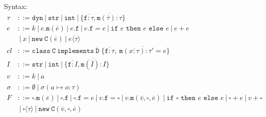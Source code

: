 \documentclass{report}
\begin{document}
\newcommand{\class}{\ensuremath{\xt{class}}\xspace}
\newcommand{\G}{\Gamma}
\renewcommand{\int}{\texttt{int}}
\newcommand{\coerce}{\Rightarrow} %
\newcommand{\str}{\texttt{str}}
\newcommand{\any}{\texttt{dyn}}   %
\newcommand{\dyn}{\texttt{dyn}}   %
\newcommand{\this}{\texttt{this}}
\newcommand{\ifthenelse}[3]{\texttt{if }#1\texttt{ then }#2\texttt{ else }#3}
\newcommand{\cast}[1]{\langle #1\rangle} 
\newcommand{\xt}[1]{\texttt{#1}}
\newcommand{\creduce}{\longrightarrow_{cr}}  %
\newcommand{\ereduce}{\longrightarrow_{e}}   %
\newcommand{\stepsto}{\longrightarrow}        %
\newcommand{\intv}[1]{\xt{int}[#1]}
\newcommand{\strv}[1]{\xt{str}[#1]}
\newcommand{\tlate}{\rightsquigarrow}
\newcommand{\s}{\sigma}
\renewcommand{\sc}{\mu}
\renewcommand{\t}{\tau}
\newcommand{\B}{\ensuremath{~|~}\xspace}
\newcommand{\new}{\ensuremath{\texttt{new}}\xspace}
\newcommand{\NEW}[2]{\ensuremath{  \new ~ #1 ( #2 )}\xspace}
\renewcommand{\bar}[1]{\ensuremath{\overline{ #1} }\xspace}
\newcommand{\m}{\ensuremath{\xt{m}}\xspace}
\newcommand{\f}{\ensuremath{\xt{f}}\xspace}
\newcommand{\C}{\ensuremath{\xt{C}}\xspace}
\newcommand{\D}{\ensuremath{\xt{D}}\xspace}
\newcommand{\is}{\mapsto}
\newcommand{\cl}{\mathit{cl}\xspace}
\newcommand{\implements}{\xt{implements}\xspace}
\newcommand{\CLASS}[3]{ \ensuremath{  \xt{class}~#1~\implements~#2\;\{ #3 \}}\xspace} 
\newcommand{\MDEF}[4] { #1( #2 ):#3 = #4}
\newcommand{\MTYPE}[3] { #1( #2 ):#3}
\newcommand{\MVAL}[3] { #1( #2 ) = #3}
\newcommand{\Gdash}{\G\vdash}


Syntax:
\begin{align*}
\t &::= \dyn \B  \str \B  \int \B  \{\bar{\f :\t},\bar{\m (\bar{\t}):\t}\}\\
e &::= k \B  e.\m(\bar{e}) \B e.\f  \B e.\f  = e \B  \ifthenelse{e}{e}{e}\B e + e \\
&\B x\B \NEW \C {\bar{e}} \B  e\cast{\t}\\
\cl &::= \CLASS \C {\bar \D} { \bar{ \f : \t }, ~ \bar{ \MDEF{\m}{\bar{x :\t}}{\t'}{e} } } \\
I &::= \str \B  \int \B  \{\bar{\f :I},\bar{\m (\bar{I}):I}\}\\
v &::= k \B a\\
\s &::= \emptyset \B  \s( a \is o : \t )\\
F &::=    \square.\m(\bar e) 
   \B 	  \square.\f 
   \B 	  \square.\f  = e
   \B     v.\f  = \square
   \B     v.\m(\bar v,\square, \bar e) 
   \B     \ifthenelse{\square}{e}{e} 
   \B     \square + e 
   \B      v + \square\\
   &\B     \square\cast{\tau}
   \B \NEW  \C {\bar{v},\square,\bar{e}}\\
\end{align*}
\end{document}
